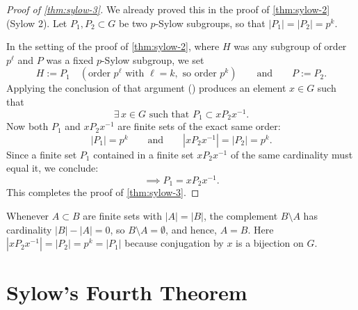 \begin{content}
\begin{proof}[Proof of \cref{thm:sylow-3}]
We already proved this in the proof of \cref{thm:sylow-2} (Sylow 2). Let $P_1, P_2 \subset G$ be two $p$-Sylow subgroups, so that $|P_1| = |P_2| = p^k$.

In the setting of the proof of \cref{thm:sylow-2}, where $H$ was any subgroup of order $p^\ell$ and $P$ was a fixed $p$-Sylow subgroup, we set
\[
H := P_1 \quad (\text{order } p^\ell \text{ with } \ell = k, \text{ so order } p^k) \qquad \text{and} \qquad P := P_2.
\]
Applying the conclusion of that argument () produces an element $x \in G$ such that
\[
\exists\, x \in G \text{ such that } P_1 \subset x P_2 x^{-1}.
\]
Now both $P_1$ and $x P_2 x^{-1}$ are finite sets of the exact same order:
\[
|P_1| = p^k \qquad \text{and} \qquad |x P_2 x^{-1}| = |P_2| = p^k.
\]
Since a finite set $P_1$ contained in a finite set $x P_2 x^{-1}$ of the same cardinality must equal it, we conclude:
\[
\implies P_1 = x P_2 x^{-1}.
\]
This completes the proof of \cref{thm:sylow-3}.
\end{proof}

\begin{steps}
Whenever $A \subset B$ are finite sets with $|A| = |B|$, the complement $B \setminus A$ has cardinality $|B| - |A| = 0$, so $B \setminus A = \emptyset$, and hence, $A = B$. Here $|x P_2 x^{-1}| = |P_2| = p^k = |P_1|$ because conjugation by $x$ is a bijection on $G$.
\end{steps}
\end{content}

\begin{hidden}
\end{hidden}

\section{Sylow's Fourth Theorem}

